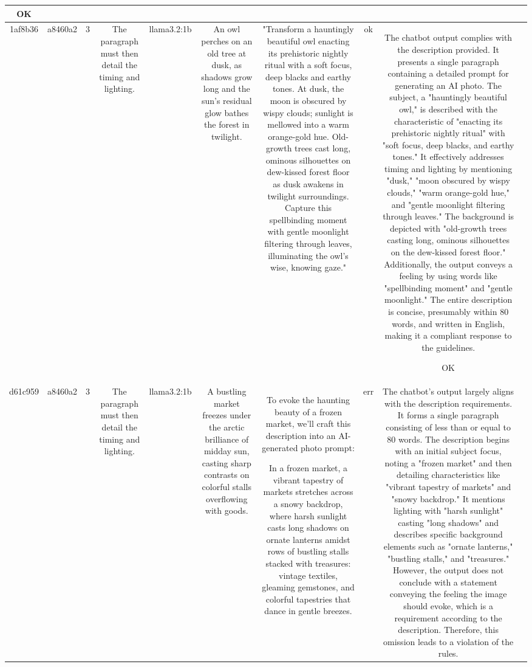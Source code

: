 \begin{table}[h!]
\begin{tabular}{|c|c|c|c|c|c|c|c|c|c|}
OK & \\
\hline
1af8b36 & a8460a2 & 3 & The paragraph must then detail the timing and lighting. & llama3.2:1b & An owl perches on an old tree at dusk, as shadows grow long and the sun's residual glow bathes the forest in twilight. & "Transform a hauntingly beautiful owl enacting its prehistoric nightly ritual with a soft focus, deep blacks and earthy tones. At dusk, the moon is obscured by wispy clouds; sunlight is mellowed into a warm orange-gold hue. Old-growth trees cast long, ominous silhouettes on dew-kissed forest floor as dusk awakens in twilight surroundings. Capture this spellbinding moment with gentle moonlight filtering through leaves, illuminating the owl's wise, knowing gaze." & ok & The chatbot output complies with the description provided. It presents a single paragraph containing a detailed prompt for generating an AI photo. The subject, a "hauntingly beautiful owl," is described with the characteristic of "enacting its prehistoric nightly ritual" with "soft focus, deep blacks, and earthy tones." It effectively addresses timing and lighting by mentioning "dusk," "moon obscured by wispy clouds," "warm orange-gold hue," and "gentle moonlight filtering through leaves." The background is depicted with "old-growth trees casting long, ominous silhouettes on the dew-kissed forest floor." Additionally, the output conveys a feeling by using words like "spellbinding moment" and "gentle moonlight." The entire description is concise, presumably within 80 words, and written in English, making it a compliant response to the guidelines.

OK & \\
\hline
d61c959 & a8460a2 & 3 & The paragraph must then detail the timing and lighting. & llama3.2:1b & A bustling market freezes under the arctic brilliance of midday sun, casting sharp contrasts on colorful stalls overflowing with goods. & To evoke the haunting beauty of a frozen market, we'll craft this description into an AI-generated photo prompt:

In a frozen market, a vibrant tapestry of markets stretches across a snowy backdrop, where harsh sunlight casts long shadows on ornate lanterns amidst rows of bustling stalls stacked with treasures: vintage textiles, gleaming gemstones, and colorful tapestries that dance in gentle breezes. & err & The chatbot's output largely aligns with the description requirements. It forms a single paragraph consisting of less than or equal to 80 words. The description begins with an initial subject focus, noting a "frozen market" and then detailing characteristics like "vibrant tapestry of markets" and "snowy backdrop." It mentions lighting with "harsh sunlight" casting "long shadows" and describes specific background elements such as "ornate lanterns," "bustling stalls," and "treasures." However, the output does not conclude with a statement conveying the feeling the image should evoke, which is a requirement according to the description. Therefore, this omission leads to a violation of the rules.


\end{tabular}
\end{table}
